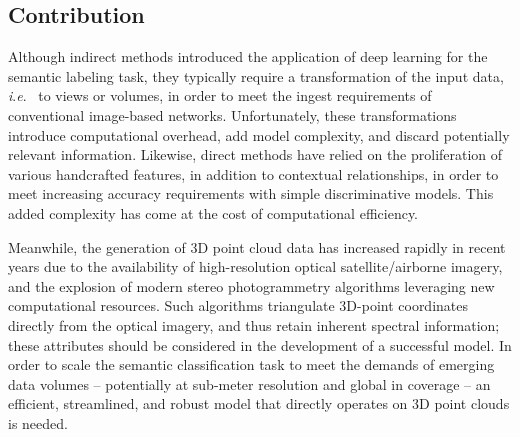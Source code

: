 \documentclass[final,3p,times,twocolumn,authoryear]{elsarticle}
\newcommand{\ie}{\textit{i}.\textit{e}.}
\begin{document}
\subsection{Contribution}
\label{sec:contribution}
Although indirect methods introduced the application of deep learning for the semantic labeling task, they typically require a transformation of the input data, \ie~ to views or volumes, in order to meet the ingest requirements of conventional image-based networks. 
Unfortunately, these transformations introduce computational overhead, add model complexity, and discard potentially relevant information.
Likewise, direct methods have relied on the proliferation of various handcrafted features, in addition to contextual relationships, in order to meet increasing accuracy requirements with simple discriminative models. 
This added complexity has come at the cost of computational efficiency. 

Meanwhile, the generation of 3D point cloud data has increased rapidly in recent years due to the availability of high-resolution optical satellite/airborne imagery, and the explosion of modern stereo photogrammetry algorithms leveraging new computational resources. 
Such algorithms triangulate 3D-point coordinates directly from the optical imagery, and thus retain inherent spectral information; these  attributes should be considered in the development of a successful model.
In order to scale the semantic classification task to meet the demands of emerging data volumes -- potentially at sub-meter resolution and global in coverage -- an efficient, streamlined, and robust model that directly operates on 3D point clouds is needed. 
\end{document}
